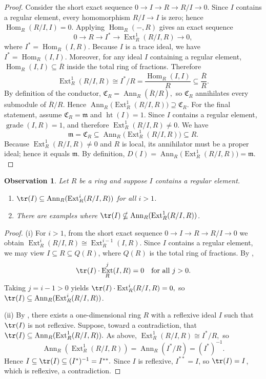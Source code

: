 \documentclass[11pt,a4paper]{amsart}
\numberwithin{equation}{section}
\newtheorem{observation}[theorem]{Observation}
\DeclareMathOperator{\grade}{grade}
\DeclareMathOperator{\Ann}{Ann}\DeclareMathOperator{\ann}{Ann}
\DeclareMathOperator{\Ht}{ht}
\DeclareMathOperator{\Ext}{Ext}
\DeclareMathOperator{\Hom}{Hom}
\begin{document}
\begin{proof}
	Consider the short exact sequence
	\(
	0 \longrightarrow I \longrightarrow R \longrightarrow R/I \longrightarrow 0.
	\)
	Since $I$ contains a regular element, every homomorphism $R/I \to I$ is zero; hence
	\(
	\Hom_R(R/I,I)=0.
	\)
	Applying $\Hom_R(-,R)$ gives an exact sequence
	\[
	0 \longrightarrow R \longrightarrow I^\ast \longrightarrow \Ext^1_R(R/I,R) \longrightarrow 0,
	\]
	where $I^\ast=\Hom_R(I,R)$.
Because $I$ is a trace ideal, we have $I^\ast=\Hom_R(I,I)$. Moreover, for any ideal $I$ containing a regular element,
	\(
	\Hom_R(I,I)\subseteq \overline{R}
	\)
	inside the total ring of fractions. Therefore
	\[
	\Ext^1_R(R/I,R)\cong I^\ast/R
	= \frac{\Hom_R(I,I)}{R}
	\subseteq \frac{\overline{R}}{R}.
	\]
	By definition of the conductor,
	\(
	\mathfrak{C}_R = \Ann_R(\overline{R}/R),
	\)
	so $\mathfrak{C}_R$ annihilates every submodule of $\overline{R}/R$. Hence
	\(
	\Ann_R\!\big(\Ext^1_R(R/I,R)\big) \supseteq \mathfrak{C}_R.
	\)
For the final statement, assume $\mathfrak{C}_R=\mathfrak{m}$ and $\Ht(I)=1$. Since $I$ contains a regular element, $\grade(I,R)=1$, and therefore
	$\Ext^1_R(R/I,R)\neq 0$. We have
	\[
	\mathfrak{m}=\mathfrak{C}_R \subseteq \Ann_R\!\big(\Ext^1_R(R/I,R)\big) \subseteq R.
	\]
	Because $\Ext^1_R(R/I,R)\neq 0$ and $R$ is local, its annihilator must be a proper ideal; hence it equals $\mathfrak{m}$. By definition,
	\(
	D(I)=\Ann_R\!\big(\Ext^1_R(R/I,R)\big)=\mathfrak{m}.
	\)
\end{proof}

\begin{observation}
	Let $R$ be a ring and suppose $I$ contains a regular element.
	\begin{enumerate}
		\item[(i)] $\tr(I)\subseteq \Ann_R(\Ext^i_R(R/I,R))$ for all $i>1$.
		\item[(ii)] There are examples where $\tr(I)\nsubseteq \Ann_R(\Ext^1_R(R/I,R))$.
	\end{enumerate}
\end{observation}

\begin{proof}
	(i) For $i>1$, from the short exact sequence
	$0\to I\to R\to R/I\to 0$ we obtain
	\(
	\Ext^i_R(R/I,R)\cong \Ext^{i-1}_R(I,R).
	\)
	Since $I$ contains a regular element, we may view $I\subseteq R\subseteq Q(R)$, where $Q(R)$ is the total ring of fractions. By \cite[Theorem 3.3]{dey},
	\[
	\tr(I)\cdot \Ext^j_R(I,R)=0 \quad \text{for all } j>0.
	\]
	Taking $j=i-1>0$ yields
	\(
	\tr(I)\cdot \Ext^i_R(R/I,R)=0,
	\)
	so $\tr(I)\subseteq \Ann_R(\Ext^i_R(R/I,R))$.
	
	(ii) By \cite{lindo}, there exists a one-dimensional ring $R$ with a reflexive ideal $I$ such that $\tr(I)$ is not reflexive. Suppose, toward a contradiction, that
	\(
	\tr(I)\subseteq \Ann_R(\Ext^1_R(R/I,R)).
	\)
	As above,
	\(
	\Ext^1_R(R/I,R)\cong I^\ast/R,
	\)
	so
	\[
	\Ann_R(\Ext^1_R(R/I,R))=\Ann_R(I^\ast/R)=(I^\ast)^{-1}.
	\]
	Hence
	\(
	I \subseteq \tr(I) \subseteq (I^\ast)^{-1}=I^{**}.
	\)
	Since $I$ is reflexive, $I^{**}=I$, so $\tr(I)=I$, which is reflexive, a contradiction. 
\end{proof}
\end{document}
